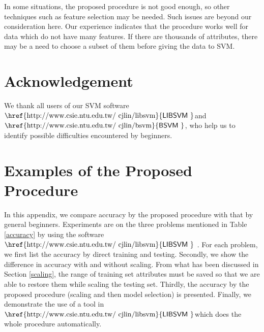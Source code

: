 \documentclass[12pt]{article}
\newcommand{\libsvm}{$\mbox{\href{http://www.csie.ntu.edu.tw/~cjlin/libsvm}{\sf LIBSVM }}$}
\newcommand{\bsvm}{$\mbox{\href{http://www.csie.ntu.edu.tw/~cjlin/bsvm}{\sf BSVM }}$}
\begin{document}
In some situations, the proposed procedure is not good
enough, so other techniques such as feature selection may
be needed. Such issues are beyond our consideration
here. Our experience indicates that the
procedure works well for data which do not
have many features. 
If there are thousands of
attributes, there may be a need to choose a 
subset of them before giving the data to SVM.

\section*{Acknowledgement}
We thank all users of our SVM software
\libsvm and \bsvm, who help us to identify
possible difficulties encountered by beginners.

\appendix

\section{Examples of the Proposed Procedure}
\label{app}

In this appendix, we compare accuracy
by the proposed procedure with that by general beginners.
Experiments are on the three problems mentioned in
Table \ref{accuracy} by using the software \libsvm
\cite{CC01a}. For each problem, we first list the
accuracy by direct training and testing. Secondly, we show 
the difference in accuracy with and without scaling.
From what has been discussed in Section \ref{scaling},
the range of training set attributes must 
be saved so that we are able to restore them while
scaling the testing set.
Thirdly, the accuracy by the proposed procedure (scaling 
and then model selection) is presented. Finally, we demonstrate 
the use of a tool in \libsvm which does 
the whole procedure automatically.
\end{document}
